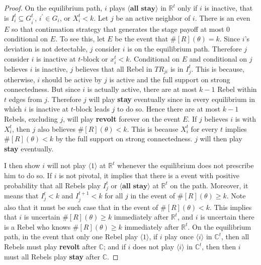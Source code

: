 \documentclass[12pt,letter]{article}
\newcommand{\Kappa}{\mathbb{C}}
\newcommand{\Omicron}{\mathbb{R}}
\theoremstyle{definition}
\theoremstyle{remark}
\theoremstyle{claim}
\begin{document}
\begin{proof}
On the equilibrium path, $i$ plays $\langle \textbf{all stay} \rangle$ in $\Omicron^t$ only if $i$ is inactive, that is $I^t_i\subseteq G^t_{i^{'}}$, $i^{'}\in G_i$, or $X^t_i<k$. Let $j$ be an active neighbor of $i$. There is an even $E$ so that continuation strategy that generates the stage payoff at most 0 conditional on $E$. To see this, let $E$ be the event that $\#[R](\theta)=k$. Since $i$'s deviation is not detectable, $j$ consider $i$ is on the equilibrium path. Therefore $j$ consider $i$ is inactive at $t$-block or $x^t_i<k$. Conditional on $E$ and conditional on $j$ believes $i$ is inactive, $j$ believes that all Rebel in $TR_{ji}$ is in $I^t_j$. This is because, otherwise, $i$ should be active by $j$ is active and the full support on strong connectedness. But since $i$ is actually active, there are at most $k-1$ Rebel within $t$ edges from $j$. Therefore $j$ will play \textbf{stay} eventually since in every equilibrium in which $i$ is inactive at $t$-block leads $j$ to do so. Hence there are at most $k-1$ Rebels, excluding $j$, will play \textbf{revolt} forever on the event $E$. If $j$ believes $i$ is with $X^t_i$, then $j$ also believes $\#[R](\theta)<k$. This is because $X^t_i$ for every $t$ implies $\#[R](\theta)<k$ by the full support on strong connectedness. $j$ will then play \textbf{stay} eventually. 

I then show $i$ will not play $\langle 1 \rangle$ at $\Omicron^t$ whenever the equilibrium does not prescribe him to do so. If $i$ is not pivotal, it implies that there is a event with positive probability that all Rebels play $I^t_j$ or $\langle \textbf{all stay} \rangle$ at $\Omicron^t$ on the path. Moreover, it means that $I^t_j<k$ and $I^{t+1}_j<k$ for all $j$ in the event of $\#[R](\theta)\geq k$. Note also that it must be such case that in the event of $\#[R](\theta)<k$. This implies that $i$ is uncertain $\#[R](\theta)\geq k$ immediately after $\Omicron^t$, and $i$ is uncertain there is a Rebel who knows $\#[R](\theta)\geq k$ immediately after $\Omicron^t$. On the equilibrium path, in the event that only one Rebel play $\langle 1 \rangle$, if $i$ play once $\langle i \rangle$ in $\Kappa^t$, then all Rebels must play \textbf{revolt} after $\Kappa$; and if $i$ does not play $\langle i \rangle$ in $\Kappa^t$, then then $i$ must all Rebels play \textbf{stay} after $\Kappa$.



\end{proof}
\end{document}
